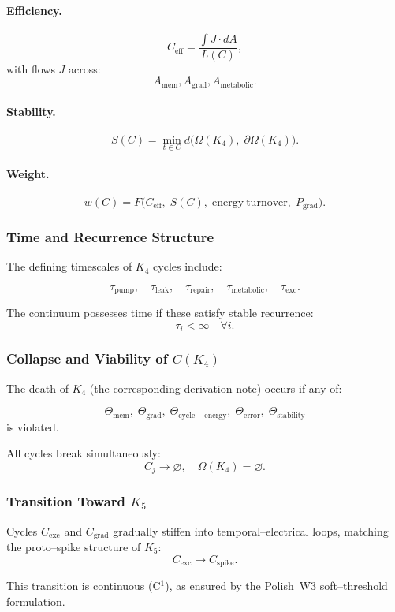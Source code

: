 \paragraph{Efficiency.}
\[
  C_{\mathrm{eff}}
    =\frac{\int J\cdot dA}{L(C)},
\]
with flows $J$ across:
\[
  A_{\mathrm{mem}}, A_{\mathrm{grad}}, A_{\mathrm{metabolic}}.
\]

\paragraph{Stability.}
\[
  S(C)
   = \min_{t\in C}
       d\bigl(
         \Omega(K_4),\;
         \partial\Omega(K_4)
       \bigr).
\]

\paragraph{Weight.}
\[
  w(C)=F\bigl(
        C_{\mathrm{eff}},\;
        S(C),\;
        \mathrm{energy\ turnover},\;
        P_{\mathrm{grad}}
      \bigr).
\]

\subsubsection{Time and Recurrence Structure}

The defining timescales of $K_4$ cycles include:

\[
  \tau_{\mathrm{pump}},\quad
  \tau_{\mathrm{leak}},\quad
  \tau_{\mathrm{repair}},\quad
  \tau_{\mathrm{metabolic}},\quad
  \tau_{\mathrm{exc}}.
\]

The continuum possesses time if these satisfy stable recurrence:
\[
  \tau_i<\infty \quad\forall i.
\]

\subsubsection{Collapse and Viability of \texorpdfstring{$C(K_4)$}{C(K_4)}}

The death of $K_4$ (the corresponding derivation note) occurs if any of:

\[
  \Theta_{\mathrm{mem}},\;
  \Theta_{\mathrm{grad}},\;
  \Theta_{\mathrm{cycle-energy}},\;
  \Theta_{\mathrm{error}},\;
  \Theta_{\mathrm{stability}}
\]
is violated.

All cycles break simultaneously:
\[
  C_j \to \varnothing,
\quad
  \Omega(K_4)=\varnothing.
\]

\subsubsection{Transition Toward \texorpdfstring{$K_5$}{K_5}}

Cycles $C_{\mathrm{exc}}$ and $C_{\mathrm{grad}}$ gradually
stiffen into temporal–electrical loops, matching the
proto–spike structure of $K_5$:
\[
  C_{\mathrm{exc}}\longrightarrow C_{\mathrm{spike}}.
\]

This transition is continuous (C$^1$), as ensured by
the Polish~W3 soft–threshold formulation.
